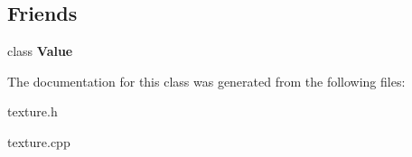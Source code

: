\subsection*{Friends}
\begin{DoxyCompactItemize}
\item 
\hypertarget{classg2c_1_1_cube_map_aeceedf6e1a7d48a588516ce2b1983d6f}{
class {\bfseries Value}}
\label{classg2c_1_1_cube_map_aeceedf6e1a7d48a588516ce2b1983d6f}

\end{DoxyCompactItemize}


The documentation for this class was generated from the following files:\begin{DoxyCompactItemize}
\item 
texture.h\item 
texture.cpp\end{DoxyCompactItemize}
